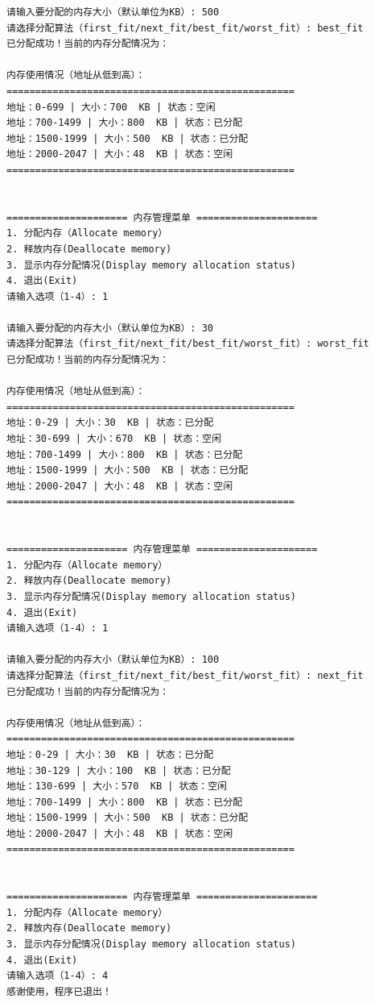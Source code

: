 \documentclass[UTF8]{ctexart}
\begin{document}
\begin{lstlisting}[frame=shadowbox]
请输入要分配的内存大小（默认单位为KB）: 500
请选择分配算法（first_fit/next_fit/best_fit/worst_fit）: best_fit
已分配成功！当前的内存分配情况为：

内存使用情况（地址从低到高）：
==================================================
地址：0-699 | 大小：700  KB | 状态：空闲
地址：700-1499 | 大小：800  KB | 状态：已分配
地址：1500-1999 | 大小：500  KB | 状态：已分配
地址：2000-2047 | 大小：48  KB | 状态：空闲
==================================================


===================== 内存管理菜单 =====================
1. 分配内存（Allocate memory）
2. 释放内存(Deallocate memory)
3. 显示内存分配情况(Display memory allocation status)
4. 退出(Exit)
请输入选项（1-4）: 1

请输入要分配的内存大小（默认单位为KB）: 30
请选择分配算法（first_fit/next_fit/best_fit/worst_fit）: worst_fit
已分配成功！当前的内存分配情况为：

内存使用情况（地址从低到高）：
==================================================
地址：0-29 | 大小：30  KB | 状态：已分配
地址：30-699 | 大小：670  KB | 状态：空闲
地址：700-1499 | 大小：800  KB | 状态：已分配
地址：1500-1999 | 大小：500  KB | 状态：已分配
地址：2000-2047 | 大小：48  KB | 状态：空闲
==================================================


===================== 内存管理菜单 =====================
1. 分配内存（Allocate memory）
2. 释放内存(Deallocate memory)
3. 显示内存分配情况(Display memory allocation status)
4. 退出(Exit)
请输入选项（1-4）: 1

请输入要分配的内存大小（默认单位为KB）: 100
请选择分配算法（first_fit/next_fit/best_fit/worst_fit）: next_fit
已分配成功！当前的内存分配情况为：

内存使用情况（地址从低到高）：
==================================================
地址：0-29 | 大小：30  KB | 状态：已分配
地址：30-129 | 大小：100  KB | 状态：已分配
地址：130-699 | 大小：570  KB | 状态：空闲
地址：700-1499 | 大小：800  KB | 状态：已分配
地址：1500-1999 | 大小：500  KB | 状态：已分配
地址：2000-2047 | 大小：48  KB | 状态：空闲
==================================================


===================== 内存管理菜单 =====================
1. 分配内存（Allocate memory）
2. 释放内存(Deallocate memory)
3. 显示内存分配情况(Display memory allocation status)
4. 退出(Exit)
请输入选项（1-4）: 4
感谢使用，程序已退出！

\end{lstlisting}
\end{document}
